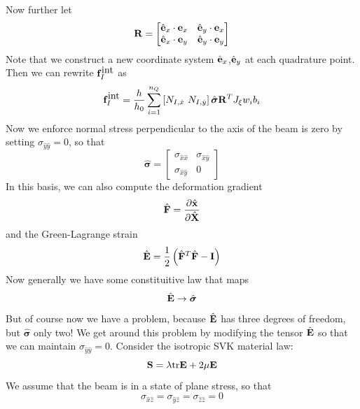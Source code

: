 \documentclass{article}
\begin{document}
Now further let 
\begin{equation} {\bf R} = \begin{bmatrix}
\hat{\bf e}_x \cdot {\bf e}_x & \hat{\bf e}_y \cdot {\bf e}_x \\
\hat{\bf e}_x \cdot {\bf e}_y & \hat{\bf e}_y \cdot {\bf e}_y
\end{bmatrix}
 \label{eq:eq7200} \end{equation}
Note that we construct a new coordinate system $\hat{\bf e}_x$,$\hat{\bf e}_y$ at each quadrature point.
Then we can rewrite ${\bf f}_I^{\mbox{int}}$ as 
\begin{equation}  {\bf f}_I^{\mbox{int}} = \frac{h}{h_0} \sum_{i=1}^{n_Q}  \left[ N_{I,\hat{x}} \ N_{I,\hat{y}}\right] \hat{ \boldsymbol \sigma  } {\bf R}^T J_{\xi} w_i b_i 
 \label{eq:eq7300} \end{equation}
Now we enforce normal stress perpendicular to the axis of the beam is zero by setting $\sigma_{\hat{y}\hat{y}} = 0$, so that
\begin{equation} \hat{ \boldsymbol \sigma  } = \begin{bmatrix}
\sigma_{\hat{x}\hat{x}} & \sigma_{\hat{x}\hat{y}} \\
\sigma_{\hat{x}\hat{y}} & 0
\end{bmatrix} \label{eq:eq7400} \end{equation}
In this basis, we can also compute the deformation gradient 
\begin{equation} \hat {\bf F} = \frac{\partial \hat{\bf x}}{\partial \hat{\bf X}} \label{eq:eq7500} \end{equation}
and the Green-Lagrange strain
\begin{equation} \hat {\bf E} = \frac{1}{2}\left( \hat {\bf F}^T \hat {\bf F} - {\bf I} \right) \label{eq:eq7600} \end{equation}
Now generally we have some constituitive law that maps
\[ \hat {\bf E} \to  \hat{ \boldsymbol \sigma  }  \]
But of course now we have a problem, because $ \hat {\bf E} $  has three degrees of freedom, but $\hat{ \boldsymbol \sigma  } $ only two!
We get around this problem by modifying the tensor $\hat {\bf E}$ so that we can maintain $\sigma_{\hat{y}\hat{y}} = 0$.  
Consider the isotropic SVK material law:
\begin{equation} {\bf S} = \lambda \mbox{tr} {\bf E} + 2\mu {\bf E}  \label{eq:eq7700} \end{equation}
We assume that the beam is in a state of plane stress, so that
\[ {\sigma}_{\hat{x}\hat{z}} = {\sigma}_{\hat{y}\hat{z}} = {\sigma}_{\hat{z}\hat{z}} = 0 \]
\end{document}
